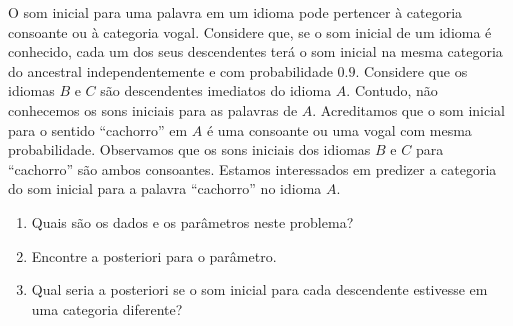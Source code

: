 \begin{exercise}
 O som inicial para uma palavra em 
 um idioma pode pertencer à categoria 
 consoante ou à categoria vogal. Considere que, 
 se o som inicial de um idioma é conhecido, 
 cada um dos seus descendentes terá o som inicial na
 mesma categoria do ancestral independentemente e 
 com probabilidade $0.9$.
 Considere que os idiomas $B$ e $C$ são 
 descendentes imediatos do idioma $A$.
 Contudo, não conhecemos os sons iniciais para 
 as palavras de $A$. Acreditamos que o som inicial para
 o sentido ``cachorro'' em $A$ é 
 uma consoante ou uma vogal com mesma probabilidade.
 Observamos que os sons iniciais dos
 idiomas $B$ e $C$ para ``cachorro'' são 
 ambos consoantes.
 Estamos interessados em predizer a 
 categoria do som inicial para 
 a palavra ``cachorro'' no idioma $A$.
 \begin{enumerate}[label=(\alph*)]
  \item Quais são os dados e 
  os parâmetros neste problema?
  \item Encontre a posteriori para o parâmetro.
  \item Qual seria a posteriori se 
  o som inicial para cada descendente estivesse 
  em uma categoria diferente?
 \end{enumerate}
\end{exercise}

